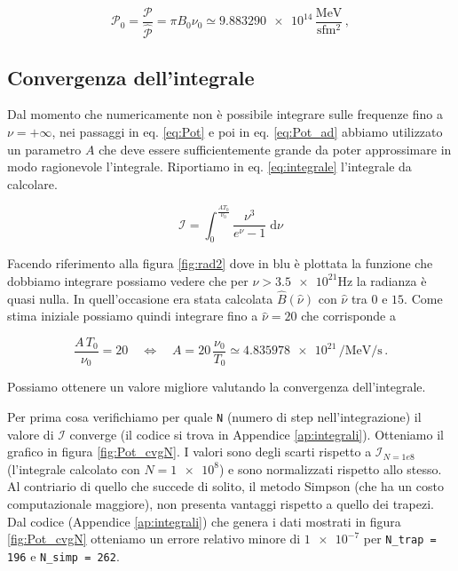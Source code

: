 \documentclass[a4paper, titlepage]{article}
\begin{document}
\begin{equation}
    \mathcal P_0 = \frac{\mathcal P}{\hat {\mathcal P}}
    = \pi B_0 \nu_0 \simeq \num{9.883290e+14} \,
    \frac{\unit{\mega\electronvolt}}{\unit{\second\femto\meter\squared}} \, ,
    \label{eq:PT_ad}
\end{equation}


\subsection{Convergenza dell'integrale}
Dal momento che numericamente non è possibile integrare sulle frequenze fino a
$\nu = + \infty$, nei passaggi in eq. \ref{eq:Pot} e poi in eq. \ref{eq:Pot_ad}
abbiamo utilizzato un parametro $A$ che deve essere sufficientemente grande da
poter approssimare in modo ragionevole l'integrale.
Riportiamo in eq. \ref{eq:integrale} l'integrale da calcolare.

\begin{equation}
    \mathcal{I} = \int_0^{\frac{A T_0}{\nu_0}}
    \frac{\nu^3}{e^{\nu} - 1} \; \mathrm{d} \nu 
    \label{eq:integrale}
\end{equation}

Facendo riferimento alla figura \ref{fig:rad2} dove in blu è plottata la
funzione che dobbiamo integrare possiamo vedere che per
$\nu > \num{3.5e21} \unit{\hertz}$ la radianza è quasi nulla.
In quell'occasione era stata calcolata $\hat B(\hat \nu)$ con $\hat \nu$ tra $0$
e $15$. Come stima iniziale possiamo quindi integrare fino a $\hat \nu = 20$ che
corrisponde a

\begin{equation}
    \frac{A \, T_0}{\nu_0} = 20
    \quad \iff \quad
    A = 20 \, \frac{\nu_0}{T_0} \simeq \num{4.835978e21} \,
    \unit{\per\mega\electronvolt\per\second} \, .
    \label{eq:A}
\end{equation}

Possiamo ottenere un valore migliore valutando la convergenza dell'integrale.

Per prima cosa verifichiamo per quale \texttt{N} (numero di step
nell'integrazione) il valore di $\mathcal{I}$ converge (il codice si trova in
Appendice \ref{ap:integrali}).
Otteniamo il grafico in figura \ref{fig:Pot_cvgN}.
I valori sono degli scarti rispetto a $\mathcal{I}_{N = 1e8}$ (l'integrale
calcolato con $N = \num{1e8}$) e sono normalizzati rispetto allo stesso.
Al contriario di quello che succede di solito, il metodo Simpson (che ha un
costo computazionale maggiore), non presenta vantaggi rispetto a quello dei
trapezi.
Dal codice (Appendice \ref{ap:integrali}) che genera i dati mostrati in figura
\ref{fig:Pot_cvgN} otteniamo un errore relativo minore di $\num{1e-7}$ per
\texttt{N\_trap = 196} e \texttt{N\_simp = 262}.
\end{document}
